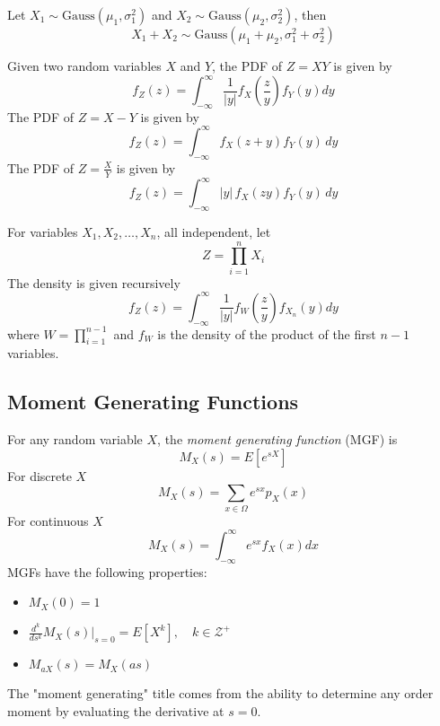 Let $X_1 \sim \text{Gauss}(\mu_1, \sigma_1^2)$ and
$X_2 \sim \text{Gauss}(\mu_2, \sigma_2^2)$, then
\begin{equation}
    X_1 + X_2 \sim \text{Gauss}\left( \mu_1 + \mu_2, \sigma_1^2 + \sigma_2^2 \right)
\end{equation}

Given two random variables $X$ and $Y$, the
PDF of $Z = XY$ is given by
\begin{equation}
    f_Z(z) = \int_{-\infty}^{\infty} \frac{1}{|y|} f_X(\frac{z}{y}) f_Y(y) dy
\end{equation}
The PDF of $Z = X - Y$ is given by
\begin{equation}
    f_Z(z) = \int_{-\infty}^{\infty} f_X(z + y) f_Y(y) \, dy
\end{equation}
The PDF of $Z = \frac{X}{Y}$ is given by
\begin{equation}
    f_Z(z) = \int_{-\infty}^{\infty} |y| \, f_X(z y) f_Y(y) \, dy
\end{equation}

For variables $X_1, X_2, \dots, X_n$, all
independent, let
\begin{equation}
    Z = \prod_{i = 1}^{n} X_i
\end{equation}
The density is given recursively
\begin{equation}
    f_Z(z) = \int_{-\infty}^{\infty} \frac{1}{|y|} f_W(\frac{z}{y}) f_{X_n}(y) dy
\end{equation}
where $W = \prod_{i=1}^{n-1}$ and $f_W$ is the
density of the product of the first $n - 1$ variables.

\subsection{Moment Generating Functions}
For any random variable $X$, the \emph{moment generating function}
(MGF) is
\begin{equation}
    M_X(s) = E\left[e^{sX}\right]
\end{equation}
For discrete $X$
\begin{equation}
    M_X(s) = \sum_{x\in \Omega} e^{sx} p_X(x)
\end{equation}
For continuous $X$
\begin{equation}
    M_X(s) = \int_{-\infty}^{\infty} e^{sx}f_X(x)dx
\end{equation}
MGFs have the following properties:
\begin{itemize}
    \item $M_X(0) = 1$ \\
    \item $\frac{d^k}{ds^k} M_X(s)\Big|_{s=0} = E\left[X^k\right], \quad k \in \mathcal{Z}^+$ \\
    \item $M_{aX}(s) = M_X(as)$
\end{itemize}
The "moment generating" title comes
from the ability to determine any order
moment by evaluating the derivative at $s=0$.

